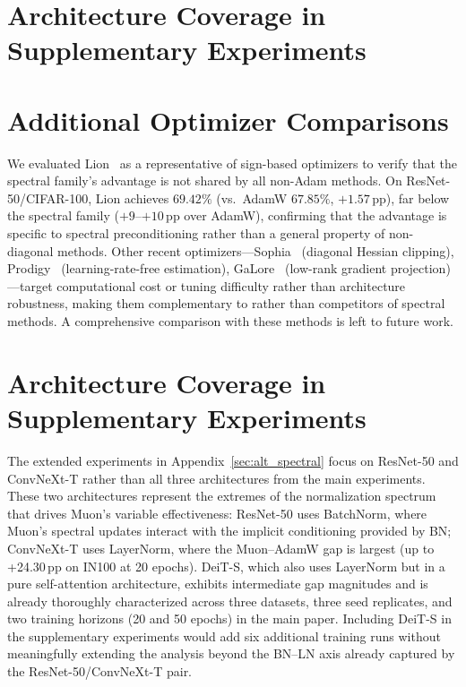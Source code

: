 \section{Architecture Coverage in Supplementary Experiments}\label{sec:arch_coverage}

\section{Additional Optimizer Comparisons}\label{sec:additional_optimizers}

We evaluated Lion~\cite{chen2024lion} as a representative of sign-based optimizers to verify that the spectral family's advantage is not shared by all non-Adam methods.
On ResNet-50/CIFAR-100, Lion achieves $69.42\%$ (vs.\ AdamW $67.85\%$, $+1.57$\,pp), far below the spectral family ($+9$--$+10$\,pp over AdamW), confirming that the advantage is specific to spectral preconditioning rather than a general property of non-diagonal methods.
Other recent optimizers---Sophia~\cite{liu2024sophia} (diagonal Hessian clipping), Prodigy~\cite{mishchenko2024prodigy} (learning-rate-free estimation), GaLore~\cite{zhao2024galore} (low-rank gradient projection)---target computational cost or tuning difficulty rather than architecture robustness, making them complementary to rather than competitors of spectral methods.
A comprehensive comparison with these methods is left to future work.

\section{Architecture Coverage in Supplementary Experiments}\label{sec:arch_coverage}

The extended experiments in Appendix~\ref{sec:alt_spectral} focus on ResNet-50 and ConvNeXt-T rather than all three architectures from the main experiments. These two architectures represent the extremes of the normalization spectrum that drives Muon's variable effectiveness: ResNet-50 uses BatchNorm, where Muon's spectral updates interact with the implicit conditioning provided by BN; ConvNeXt-T uses LayerNorm, where the Muon--AdamW gap is largest (up to +24.30\,pp on IN100 at 20 epochs). DeiT-S, which also uses LayerNorm but in a pure self-attention architecture, exhibits intermediate gap magnitudes and is already thoroughly characterized across three datasets, three seed replicates, and two training horizons (20 and 50 epochs) in the main paper. Including DeiT-S in the supplementary experiments would add six additional training runs without meaningfully extending the analysis beyond the BN--LN axis already captured by the ResNet-50/ConvNeXt-T pair.

